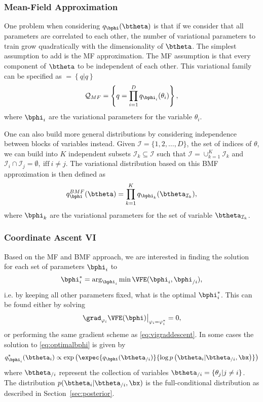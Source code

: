 \subsubsection{Mean-Field Approximation}

One problem when considering $q_{\bphi}(\btheta)$ is that if we consider that all parameters are correlated to each other, the number of variational parameters to train grow quadratically with the dimensionality of $\btheta$.
The simplest assumption to add is the \ac{MF} approximation.
The \ac{MF} assumption is that every component of $\btheta$ to be independent of each other.
This variational family can be specified as $ = \left\{q | q \right\}$
\begin{align}
    \mathcal{Q}_{MF}= \left\{q = \prod_{i=1}^D q_{\bphi_i}(\theta_i)\right\},
\end{align}
where $\bphi_i$ are the variational parameters for the variable $\theta_i$.

One can also build more general distributions by considering independence between blocks of variables instead.
Given $\mathcal{I}=\{1,2,\ldots,D\}$, the set of indices of $\theta$, we can build into $K$ independent subsets $\mathcal{I}_k \subseteq \mathcal{I}$ such that  $\mathcal{I} = \cup_{k=1}^K \mathcal{I}_{k}$ and $\mathcal{I}_i \cap \mathcal{I}_j=\emptyset,~\mathrm{iff}~i \neq j$.
The variational distribution based on this \ac{BMF} approximation is then defined as
\begin{align}
    q^{BMF}_{\bphi}(\btheta) = \prod_{k=1}^K q_{\bphi_k}(\btheta_{\mathcal{I}_k}),
\end{align}
where $\bphi_k$ are the variational parameters for the set of variable $\btheta_{\mathcal{I}_k}$.

\subsubsection{Coordinate Ascent VI}
\label{sec:cavi}
Based on the \ac{MF} and \ac{BMF} approach, we are interested in finding the solution for each set of parameters $\bphi_i$ to
\begin{align}
    \bphi_i^* = \arg_{\bphi_i}\min \VFE(\bphi_i, \bphi_{/i}),
    \label{eq:optimalbphi}
\end{align}
i.e. by keeping all other parameters fixed, what is the optimal $\bphi_i^*$.
This can be found either by solving
\begin{align}
\left.\grad_{\varphi_i}\VFE(\bphi)\right\vert_{\varphi_i=\varphi_i^*} = 0,
\end{align}
or performing the same gradient scheme as \eqref{eq:vigraddescent}.
In some cases the solution to \eqref{eq:optimalbphi} is given by
\begin{align}
q_{\bphi_i}^*(\btheta_i) \propto \exp\left(\expec{q_{\bphi}(\btheta_{/i})}{\log p\left(\btheta_i|\btheta_{/i},\bx\right)}\right)
\end{align}
where $\btheta_{/i}$ represent the collection of variables $\btheta_{/i} = \{\theta_j | j \neq i\}$.
The distribution $p(\btheta_i|\btheta_{/i},\bx)$ is the full-conditional distribution as described in Section~\ref{sec:posterior}.

